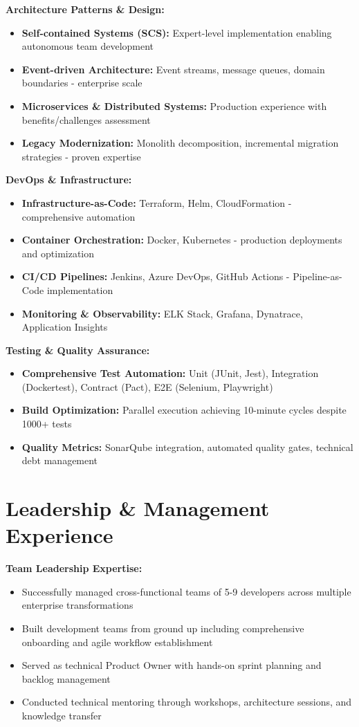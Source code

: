 \documentclass[10pt,a4paper]{article}
\begin{document}
\textbf{Architecture Patterns \& Design:}
\begin{itemize}[leftmargin=12pt,itemsep=1pt]
\item \textbf{Self-contained Systems (SCS):} Expert-level implementation enabling autonomous team development
\item \textbf{Event-driven Architecture:} Event streams, message queues, domain boundaries - enterprise scale
\item \textbf{Microservices \& Distributed Systems:} Production experience with benefits/challenges assessment
\item \textbf{Legacy Modernization:} Monolith decomposition, incremental migration strategies - proven expertise
\end{itemize}

\textbf{DevOps \& Infrastructure:}
\begin{itemize}[leftmargin=12pt,itemsep=1pt]
\item \textbf{Infrastructure-as-Code:} Terraform, Helm, CloudFormation - comprehensive automation
\item \textbf{Container Orchestration:} Docker, Kubernetes - production deployments and optimization
\item \textbf{CI/CD Pipelines:} Jenkins, Azure DevOps, GitHub Actions - Pipeline-as-Code implementation
\item \textbf{Monitoring \& Observability:} ELK Stack, Grafana, Dynatrace, Application Insights
\end{itemize}

\textbf{Testing \& Quality Assurance:}
\begin{itemize}[leftmargin=12pt,itemsep=1pt]
\item \textbf{Comprehensive Test Automation:} Unit (JUnit, Jest), Integration (Dockertest), Contract (Pact), E2E (Selenium, Playwright)
\item \textbf{Build Optimization:} Parallel execution achieving 10-minute cycles despite 1000+ tests
\item \textbf{Quality Metrics:} SonarQube integration, automated quality gates, technical debt management
\end{itemize}

\section{Leadership \& Management Experience}

\textbf{Team Leadership Expertise:}
\begin{itemize}[leftmargin=12pt,itemsep=1pt]
\item Successfully managed cross-functional teams of 5-9 developers across multiple enterprise transformations
\item Built development teams from ground up including comprehensive onboarding and agile workflow establishment
\item Served as technical Product Owner with hands-on sprint planning and backlog management
\item Conducted technical mentoring through workshops, architecture sessions, and knowledge transfer
\end{itemize}
\end{document}
